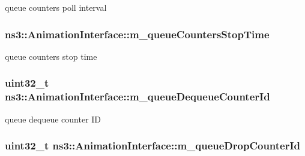 queue counters poll interval 

\subsubsection[{\texorpdfstring{m\+\_\+queue\+Counters\+Stop\+Time}{m_queueCountersStopTime}}]{ ns3\+::\+Animation\+Interface\+::m\+\_\+queue\+Counters\+Stop\+Time\hspace{0.3cm}{\ttfamily [private]}}\hypertarget{classns3_1_1AnimationInterface_a7dfb84240a6270b389e3da77e215f503}{}\label{classns3_1_1AnimationInterface_a7dfb84240a6270b389e3da77e215f503}


queue counters stop time 

\subsubsection[{\texorpdfstring{m\+\_\+queue\+Dequeue\+Counter\+Id}{m_queueDequeueCounterId}}]{\setlength{\rightskip}{0pt plus 5cm}uint32\+\_\+t ns3\+::\+Animation\+Interface\+::m\+\_\+queue\+Dequeue\+Counter\+Id\hspace{0.3cm}{\ttfamily [private]}}\hypertarget{classns3_1_1AnimationInterface_a768ca45226f8c1b690c029f76c86fdaa}{}\label{classns3_1_1AnimationInterface_a768ca45226f8c1b690c029f76c86fdaa}


queue dequeue counter ID 

\subsubsection[{\texorpdfstring{m\+\_\+queue\+Drop\+Counter\+Id}{m_queueDropCounterId}}]{\setlength{\rightskip}{0pt plus 5cm}uint32\+\_\+t ns3\+::\+Animation\+Interface\+::m\+\_\+queue\+Drop\+Counter\+Id\hspace{0.3cm}{\ttfamily [private]}}\hypertarget{classns3_1_1AnimationInterface_a0f96f618c8aae5a68b84efc5ac31f6f6}{}\label{classns3_1_1AnimationInterface_a0f96f618c8aae5a68b84efc5ac31f6f6}


